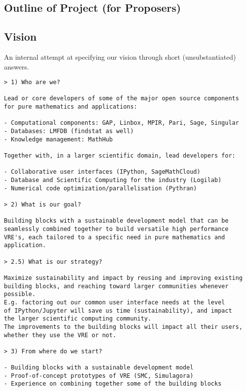 \begin{draft}
\section*{Outline of Project (for Proposers)}


\subsection*{Vision}

An internal attempt at specifying our vision through short
(unsubstantiated) answers.

\begin{verbatim}
> 1) Who are we?

Lead or core developers of some of the major open source components
for pure mathematics and applications:

- Computational components: GAP, Linbox, MPIR, Pari, Sage, Singular
- Databases: LMFDB (findstat as well)
- Knowledge management: MathHub

Together with, in a larger scientific domain, lead developers for:

- Collaborative user interfaces (IPython, SageMathCloud)
- Database and Scientific Computing for the industry (Logilab)
- Numerical code optimization/parallelisation (Pythran)

> 2) What is our goal?

Building blocks with a sustainable development model that can be
seamlessly combined together to build versatile high performance
VRE's, each tailored to a specific need in pure mathematics and
application.

> 2.5) What is our strategy?

Maximize sustainability and impact by reusing and improving existing
building blocks, and reaching toward larger communities whenever possible.
E.g. factoring out our common user interface needs at the level
of IPython/Jupyter will save us time (sustainability), and impact
the larger scientific computing community.
The improvements to the building blocks will impact all their users,
whether they use the VRE or not.

> 3) From where do we start?

- Building blocks with a sustainable development model
- Proof-of-concept prototypes of VRE (SMC, Simulagora)
- Experience on combining together some of the building blocks


\end{verbatim}
\end{draft}
